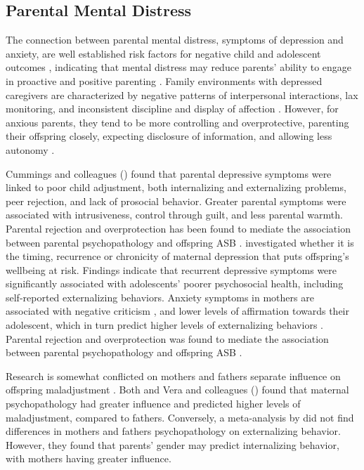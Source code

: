 \subsection{Parental Mental Distress}

The connection between parental mental distress, symptoms of depression and anxiety, are well established risk factors for negative child and adolescent outcomes \parencite[e.g.,][]{cummings:1994, goodman:2006, hails:2018, hawes:2005}, indicating that mental distress may reduce parents' ability to engage in proactive and positive parenting \parencite{elgar:2007, joyner:2021}. Family environments with depressed caregivers are characterized by negative patterns of interpersonal interactions, lax monitoring, and inconsistent discipline and display of affection \parencite{elgar:2007, korhonen:2014}. However, for anxious parents, they tend to be more controlling and overprotective, parenting their offspring closely, expecting disclosure of information, and allowing less autonomy \parencite{jones:2021, vera:2012}.

Cummings and colleagues (\citeyear{cummings:2005}) found that parental depressive symptoms were linked to poor child adjustment, both internalizing and externalizing problems, peer rejection, and lack of prosocial behavior. Greater parental symptoms were associated with intrusiveness, control through guilt, and less parental warmth. Parental rejection and overprotection has been found to mediate the association between parental psychopathology and offspring ASB \parencite{vera:2012}. \textcite{korhonen:2014} investigated whether it is the timing, recurrence or chronicity of maternal depression that puts offspring's wellbeing at risk. Findings indicate that recurrent depressive symptoms were significantly associated with adolescents' poorer psychosocial health, including self-reported externalizing behaviors. Anxiety symptoms in mothers are associated with negative criticism \parencite{hirshfeld:1997}, and lower levels of affirmation towards their adolescent, which in turn predict higher levels of externalizing behaviors \parencite{bellina:2020}. Parental rejection and overprotection was found to mediate the association between parental psychopathology and offspring ASB \parencite{vera:2012}.

Research is somewhat conflicted on mothers and fathers separate influence on offspring maladjustment \parencite{cummings:2005, sweeney:2016}. Both \textcite{marmorstein:2004} and Vera and colleagues (\citeyear{vera:2012}) found that maternal psychopathology had greater influence and predicted higher levels of maladjustment, compared to fathers. Conversely, a meta-analysis by \textcite{connell:2002} did not find differences in mothers and fathers psychopathology on externalizing behavior. However, they found that parents' gender may predict internalizing behavior, with mothers having greater influence.

